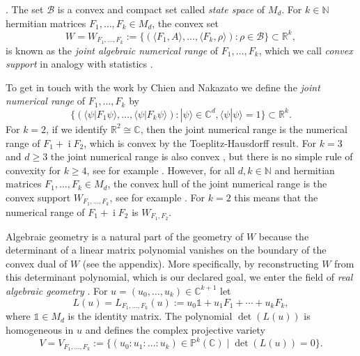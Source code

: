 \documentclass[12pt]{amsart}
\theoremstyle{definition}
\numberwithin{equation}{section}
\begin{document}
\cite{BengtssonZyczkowski2006}. The set ${\mathcal B}$ is a convex and compact set 
called {\em state space} \cite{AlfsenShultz2001} of $M_d$. For $k\in{\mathbb N}$ 
hermitian matrices $F_1,\ldots,F_k\in M_d$, the convex set 
\[
W=W_{F_1,\ldots,F_k}
:=\{(\langle F_1,A\rangle,\ldots,\langle F_k,\rho\rangle) 
 : \rho\in{\mathcal B}\}\subset{\mathbb R}^k,
\]
is known as the {\em joint algebraic numerical range} \cite{Mueller2010} 
of $F_1,\ldots,F_k$, which we call {\em convex support} \cite{Weis2011} in 
analogy with statistics \cite{Barndorff-Nielsen1978}. 
\par
To get in touch with the work \cite{ChienNakazato2010} by Chien and 
Nakazato we define the {\em joint numerical range} of $F_1,\ldots,F_k$ by
\[
\{(\langle\psi|F_1\psi\rangle,\ldots,\langle \psi|F_k\psi\rangle) :
|\psi\rangle\in{\mathbb C}^d, \langle \psi|\psi\rangle=1\}\subset{\mathbb R}^k.
\]
For $k=2$, if we identify ${\mathbb R}^2\cong{\mathbb C}$, then the joint numerical range is 
the numerical range of $F_1+{\operatorname{i}} F_2$, which is convex by the Toeplitz-Hausdorff 
result. For $k=3$ and $d\geq 3$ the joint numerical range is also convex 
\cite{Au-YeungPoon1979}, but there is no simple rule of convexity for 
$k\geq 4$, see for example \cite{LiPoon2000}. However, for all $d,k\in{\mathbb N}$ 
and hermitian matrices $F_1,\ldots,F_k\in M_d$, the convex hull of the joint 
numerical range is the convex support $W_{F_1,\ldots,F_k}$, see for example 
\cite{Mueller2010,Szymanski-etal2016}. For $k=2$ this means 
\cite{BerberianOrland1967} that the numerical range of $F_1+{\operatorname{i}} F_2$ 
is $W_{F_1,F_2}$. 
\par
Algebraic geometry is a natural part of the geometry of $W$ because the 
determinant of a linear matrix polynomial vanishes on the boundary of the 
convex dual of $W$ (see the appendix). More specifically, by reconstructing 
$W$ from this determinant polynomial, which is our declared goal, we enter 
the field of {\em real algebraic geometry} \cite{Bochnak-etal1998}. For 
$u=(u_0,\ldots,u_k)\in{\mathbb C}^{k+1}$ let 
\begin{equation}\label{eq:linm}
L(u)=L_{F_1,\ldots,F_k}(u):=u_0{\mathds{1}}+u_1F_1+\cdots+u_kF_k,
\end{equation}
where ${\mathds{1}}\in M_d$ is the identity matrix. The polynomial $\det(L(u))$ 
is homogeneous in $u$ and defines the complex projective variety 
\begin{equation}\label{eq:det-variety}
V=V_{F_1,\ldots,F_k}
:=\{(u_0:u_1:\ldots:u_k)\in{\mathbb P}^k({\mathbb C})\mid \det(L(u))=0 \}.
\end{equation}
\end{document}
